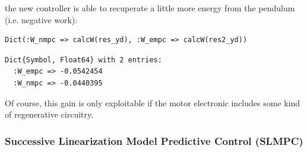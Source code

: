 \noindent the new controller is able to recuperate a little more energy from the pendulum (i.e. negative work):
\begin{verbatim}
Dict(:W_nmpc => calcW(res_yd), :W_empc => calcW(res2_yd))
\end{verbatim}
\spacerepl
\begin{verbatim}
Dict{Symbol, Float64} with 2 entries:
  :W_empc => -0.0542454
  :W_nmpc => -0.0440395
\end{verbatim}
Of course, this gain is only exploitable if the motor electronic includes some kind of regenerative circuitry.

\subsubsection{Successive Linearization Model Predictive Control (SLMPC)}
\label{sec:successive_linearization}

